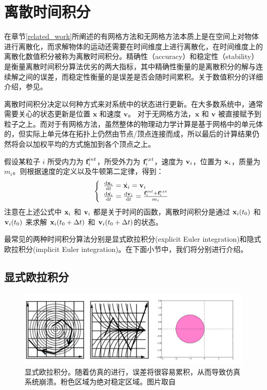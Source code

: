\section{离散时间积分}
\label{numerical_method}
在章节\ref{related_work}所阐述的有网格方法和无网格方法本质上是在空间上对物体进行离散化，而求解物体的运动还需要在时间维度上进行离散化，在时间维度上的离散化数值积分被称为离散时间积分。精确性（accuracy）和稳定性（stability）是衡量离散时间积分算法优劣的两大指标，其中精确性衡量的是离散积分的解与连续解之间的误差，而稳定性衡量的是误差是否会随时间累积。关于数值积分的详细介绍，参见。

离散时间积分决定以何种方式来对系统中的状态进行更新。在大多数系统中，通常需要关心的状态更新是位置 $\textbf{x}$ 和速度 $\textbf{v}$。 对于无网格方法，$\textbf{x}$ 和 $\textbf{v}$ 被直接赋予到粒子之上。而对于有网格方法，虽然整体的物理动力学计算是基于网格中的单元体的，但实际上单元体在拓扑上仍然由节点/顶点连接而成，所以最后的计算结果仍然将会以加权平均的方式施加到各个顶点之上。

假设某粒子 $i$ 所受内力为 $\textbf{f}_i^{int}$，所受外力为 $\textbf{f}_i^{ext}$，速度为 $\textbf{v}_i$，位置为 $\textbf{x}_i$，质量为 $m_i$。则根据速度的定义以及牛顿第二定律，得到：
\begin{equation}
\label{eq1}
\left\{ \begin{array}{l}
\frac{\textrm{d}\textbf{x}_i}{\textrm{d}t} = \dot{\textbf{x}_i}=\textbf{v}_i\\
\frac{\textrm{d}\dot{\textbf{x}_i}}{\textrm{d}t} = \frac{\textrm{d}\textbf{v}_i}{\textrm{d}t}=\frac{\textbf{f}_i^{int} + \textbf{f}_i^{ext}}{m_i}
\end{array} \right.
\end{equation}
注意在上述公式中 $\textbf{x}_i$ 和 $\textbf{v}_i$ 都是关于时间的函数，离散时间积分是通过 $\textbf{x}_i(t_0)$ 和 $\textbf{v}_i(t_0)$ 来求解 $\textbf{x}_i(t_0 + \Delta t)$ 和 $\textbf{v}_i(t_0 + \Delta t)$的状态。

最常见的两种时间积分算法分别是显式欧拉积分(explicit Euler integration)和隐式欧拉积分(implicit Euler integration)。在下面小节中，我们将分别进行介绍。

\subsection{显式欧拉积分}
\label{explicit_euler_method}

\begin{figure}[!htb]
  \centering
  \captionsetup{justification=centering}
  \includegraphics[width=\linewidth]{chap/image/explicit_method}

  \caption{\label{explicit_method}
           显式欧拉积分。随着仿真的进行，误差将很容易累积，从而导致仿真系统崩溃。粉色区域为绝对稳定区域。图片取自
          }
\end{figure}

